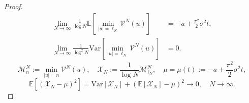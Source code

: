 \begin{proof}
    \quad

    \begin{align}
        \lim_{N\to\infty}
        \frac 1{\log N}
        \mathbb E\left[
            \min_{|u|=\ell_N}\mathcal V^N(u)
        \right]
        &
        =
        -a+\frac{\pi^2}2\sigma^2t,
        \label{eq:4.13}
        \\
        \lim_{N\to\infty}
        \frac 1{\log^2 N}
        \mathrm{Var}\!\left[
            \min_{|u|=\ell_N}\mathcal V^N(u)
        \right]
        &
        =
        0.
        \label{eq:4.14}
    \end{align}
    \begin{equation*}
        \mathcal M^N_n:=\min_{|u|=n}\mathcal V^N(u), \quad
        \mathcal X_N:=\frac 1{\log N}\mathcal M^N_{\ell_N}, \quad
        \mu=\mu(t):=-a+\frac{\pi^2}2\sigma^2t,
    \end{equation*}
    \begin{equation*}
        \mathbb E\left[
            \left(
                \mathcal X_N-\mu
            \right)^2
        \right]
        =
        \mathrm{Var}\!\left[
            \mathcal X_N
        \right]
        +
        \left(
            \mathbb E\left[
                \mathcal X_N
            \right]
            -\mu
        \right)^2
        \xrightarrow{}
        0,
        \quad
        N\to\infty.
    \end{equation*}

    \quad


\end{proof}
